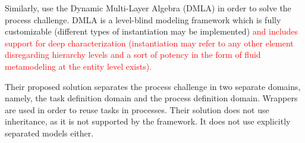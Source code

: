 
Similarly, \cite{dmla2019} use the Dynamic Multi-Layer Algebra (DMLA) \parencite{dmla2017} in order to solve the process challenge. DMLA is a level-blind modeling framework which is fully customizable (\eg different types of instantiation may be implemented) \textcolor{red}{and includes support for deep characterization (instantiation may refer to any other element disregarding hierarchy levels and a sort of potency in the form of fluid metamodeling at the entity level exists).}


Their proposed solution separates the process challenge in two separate domains, namely, the task definition domain and the process definition domain. Wrappers are used in order to reuse tasks in processes. Their solution does not use inheritance, as it is not supported by the framework. It does not use explicitly separated models either.



